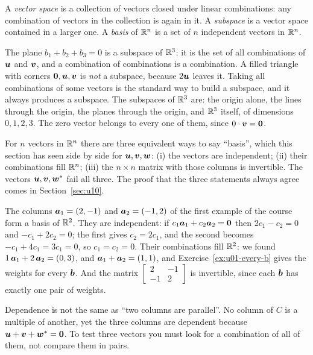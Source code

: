 \begin{definition}\label{def:u02-subspace}
A \emph{vector space} is a collection of vectors closed under linear combinations: any
combination of vectors in the collection is again in it. A \emph{subspace} is a vector space
contained in a larger one. A \emph{basis} of $\mathbb{R}^n$ is a set of $n$ independent vectors in
$\mathbb{R}^n$.
\end{definition}

The plane $b_1+b_2+b_3=0$ is a subspace of $\mathbb{R}^3$: it is the set of all combinations of
$\boldsymbol{u}$ and $\boldsymbol{v}$, and a combination of combinations is a combination. A filled triangle
with corners $\boldsymbol{0},\boldsymbol{u},\boldsymbol{v}$ is \emph{not} a subspace, because $2\boldsymbol{u}$ leaves it.
Taking all combinations of some vectors is the standard way to build a subspace, and it
always produces a subspace. The subspaces of $\mathbb{R}^3$ are: the origin alone, the lines
through the origin, the planes through the origin, and $\mathbb{R}^3$ itself, of dimensions
$0,1,2,3$. The zero vector belongs to every one of them, since $0\cdot\boldsymbol{v}=\boldsymbol{0}$.

For $n$ vectors in $\mathbb{R}^n$ there are three equivalent ways to say ``basis'', which this
section has seen side by side for $\boldsymbol{u},\boldsymbol{v},\boldsymbol{w}$: (i) the vectors are independent;
(ii) their combinations fill $\mathbb{R}^n$; (iii) the $n\times n$ matrix with those columns is
invertible. The vectors $\boldsymbol{u},\boldsymbol{v},\boldsymbol{w}^{*}$ fail all three. The proof that the three
statements always agree comes in Section~\ref{sec:u10}.

\begin{example}\label{ex:u02-basis2}
The columns $\boldsymbol{a}_1=(2,-1)$ and $\boldsymbol{a}_2=(-1,2)$ of the first example of the course form a
basis of $\mathbb{R}^2$. They are independent: if $c_1\boldsymbol{a}_1+c_2\boldsymbol{a}_2=\boldsymbol{0}$ then
$2c_1-c_2=0$ and $-c_1+2c_2=0$; the first gives $c_2=2c_1$, and the second becomes
$-c_1+4c_1=3c_1=0$, so $c_1=c_2=0$. Their combinations fill $\mathbb{R}^2$: we found
$1\,\boldsymbol{a}_1+2\,\boldsymbol{a}_2=(0,3)$, and $\boldsymbol{a}_1+\boldsymbol{a}_2=(1,1)$, and
Exercise~\ref{ex:u01-every-b} gives the weights for every $\boldsymbol{b}$. And the matrix
$\begin{bmatrix} 2 & -1\\ -1 & 2\end{bmatrix}$ is invertible, since each $\boldsymbol{b}$ has exactly
one pair of weights.
\end{example}

\begin{trap}
Dependence is not the same as ``two columns are parallel''. No column of $C$ is a multiple of
another, yet the three columns are dependent because $\boldsymbol{u}+\boldsymbol{v}+\boldsymbol{w}^{*}=\boldsymbol{0}$. To
test three vectors you must look for a combination of all of them, not compare them in pairs.
\end{trap}

